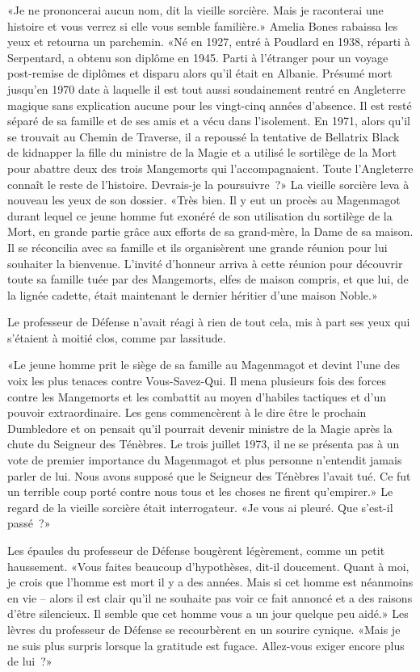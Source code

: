 «Je ne prononcerai aucun nom, dit la vieille sorcière. Mais je raconterai une histoire et vous verrez si elle vous semble familière.» Amelia Bones rabaissa les yeux et retourna un parchemin. «Né en 1927, entré à Poudlard en 1938, réparti à Serpentard, a obtenu son diplôme en 1945. Parti à l'étranger pour un voyage post-remise de diplômes et disparu alors qu'il était en Albanie. Présumé mort jusqu'en 1970 date à laquelle il est tout aussi soudainement rentré en Angleterre magique sans explication aucune pour les vingt-cinq années d'absence. Il est resté séparé de sa famille et de ses amis et a vécu dans l'isolement. En 1971, alors qu'il se trouvait au Chemin de Traverse, il a repoussé la tentative de Bellatrix Black de kidnapper la fille du ministre de la Magie et a utilisé le sortilège de la Mort pour abattre deux des trois Mangemorts qui l'accompagnaient. Toute l'Angleterre connaît le reste de l'histoire. Devrais-je la poursuivre~?» La vieille sorcière leva à nouveau les yeux de son dossier. «Très bien. Il y eut un procès au Magenmagot durant lequel ce jeune homme fut exonéré de son utilisation du sortilège de la Mort, en grande partie grâce aux efforts de sa grand-mère, la Dame de sa maison. Il se réconcilia avec sa famille et ils organisèrent une grande réunion pour lui souhaiter la bienvenue. L'invité d'honneur arriva à cette réunion pour découvrir toute sa famille tuée par des Mangemorts, elfes de maison compris, et que lui, de la lignée cadette, était maintenant le dernier héritier d'une maison Noble.»

Le professeur de Défense n'avait réagi à rien de tout cela, mis à part ses yeux qui s'étaient à moitié clos, comme par lassitude.

«Le jeune homme prit le siège de sa famille au Magenmagot et devint l'une des voix les plus tenaces contre Vous-Savez-Qui. Il mena plusieurs fois des forces contre les Mangemorts et les combattit au moyen d'habiles tactiques et d'un pouvoir extraordinaire. Les gens commencèrent à le dire être le prochain Dumbledore et on pensait qu'il pourrait devenir ministre de la Magie après la chute du Seigneur des Ténèbres. Le trois juillet 1973, il ne se présenta pas à un vote de premier importance du Magenmagot et plus personne n'entendit jamais parler de lui. Nous avons supposé que le Seigneur des Ténèbres l'avait tué. Ce fut un terrible coup porté contre nous tous et les choses ne firent qu'empirer.» Le regard de la vieille sorcière était interrogateur. «Je vous ai pleuré. Que s'est-il passé~?»

Les épaules du professeur de Défense bougèrent légèrement, comme un petit haussement. «Vous faites beaucoup d'hypothèses, dit-il doucement. Quant à moi, je crois que l'homme est mort il y a des années. Mais si cet homme est néanmoins en vie -- alors il est clair qu'il ne souhaite pas voir ce fait annoncé et a des raisons d'être silencieux. Il semble que cet homme vous a un jour quelque peu aidé.» Les lèvres du professeur de Défense se recourbèrent en un sourire cynique. «Mais je ne suis plus surpris lorsque la gratitude est fugace. Allez-vous exiger encore plus de lui~?»

